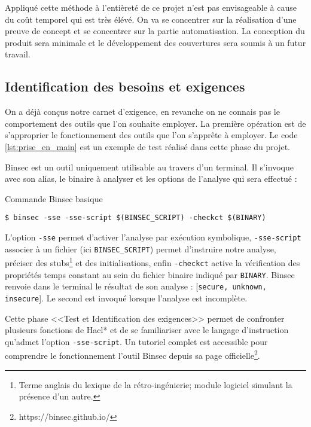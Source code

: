 Appliqué cette méthode à l'entièreté de ce projet n'est pas envisageable à cause du coût temporel qui est très élévé. On va se concentrer sur la réalisation d'une preuve de concept et se concentrer sur la partie automatisation. La conception du produit sera minimale et le développement des couvertures sera soumis à un futur travail.

\subsection*{Identification des besoins et exigences}

On a déjà conçus notre carnet d'exigence, en revanche on ne connais pas le comportement des outils que l'on souhaite employer. La première opération est de s'approprier le fonctionnement des outils que l'on s'apprête à employer. Le code \ref{lst:prise_en_main} est un exemple de test réalisé dans cette phase du projet.

Binsec est un outil uniquement utilisable au travers d'un terminal. Il s'invoque avec son alias, le binaire à analyser et les options de l'analyse qui sera effectué :

\begin{listing}[!ht]
    \caption{Commande Binsec basique}
    \label{lst:commande_binsec}
    \begin{verbatim}
$ binsec -sse -sse-script $(BINSEC_SCRIPT) -checkct $(BINARY)
    \end{verbatim}
\end{listing}

L'option \texttt{-sse} permet d'activer l'analyse par exécution symbolique, \texttt{-sse-script} associer à un fichier (ici \texttt{BINSEC\_SCRIPT}) permet d'instruire notre analyse, préciser des stubs\footnote{Terme anglais du lexique de la rétro-ingénierie; module logiciel simulant la présence d'un autre.} et des initialisations, enfin \texttt{-checkct} active la vérification des propriétés temps constant au sein du fichier binaire indiqué par \texttt{BINARY}. Binsec renvoie dans le terminal le résultat de son analyse : [\texttt{secure, unknown, insecure}]. Le second est invoqué lorsque l'analyse est incomplète.\medbreak

Cette phase <<Test et Identification des exigences>> permet de confronter plusieurs fonctions de Hacl* et de se familiariser avec le langage d'instruction qu'admet l'option \texttt{-sse-script}. Un tutoriel complet est accessible pour comprendre le fonctionnement l'outil Binsec depuis sa page officielle\footnote{https://binsec.github.io/}.

